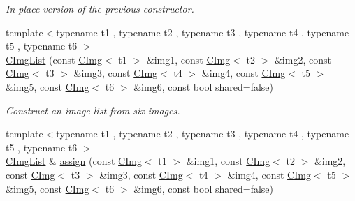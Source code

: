 \begin{DoxyCompactItemize}
\begin{DoxyCompactList}\small\item\em In-\/place version of the previous constructor. \end{DoxyCompactList}\item 
\hypertarget{structcimg__library_1_1_c_img_list_ae6799cfa63ac4f262913a46973d15012}{{\footnotesize template$<$typename t1 , typename t2 , typename t3 , typename t4 , typename t5 , typename t6 $>$ }\\\hyperlink{structcimg__library_1_1_c_img_list_ae6799cfa63ac4f262913a46973d15012}{C\-Img\-List} (const \hyperlink{structcimg__library_1_1_c_img}{C\-Img}$<$ t1 $>$ \&img1, const \hyperlink{structcimg__library_1_1_c_img}{C\-Img}$<$ t2 $>$ \&img2, const \hyperlink{structcimg__library_1_1_c_img}{C\-Img}$<$ t3 $>$ \&img3, const \hyperlink{structcimg__library_1_1_c_img}{C\-Img}$<$ t4 $>$ \&img4, const \hyperlink{structcimg__library_1_1_c_img}{C\-Img}$<$ t5 $>$ \&img5, const \hyperlink{structcimg__library_1_1_c_img}{C\-Img}$<$ t6 $>$ \&img6, const bool shared=false)}\label{structcimg__library_1_1_c_img_list_ae6799cfa63ac4f262913a46973d15012}

\begin{DoxyCompactList}\small\item\em Construct an image list from six images. \end{DoxyCompactList}\item 
\hypertarget{structcimg__library_1_1_c_img_list_ab2065358142d8ad6801b7ff5cc4146c6}{{\footnotesize template$<$typename t1 , typename t2 , typename t3 , typename t4 , typename t5 , typename t6 $>$ }\\\hyperlink{structcimg__library_1_1_c_img_list}{C\-Img\-List} \& \hyperlink{structcimg__library_1_1_c_img_list_ab2065358142d8ad6801b7ff5cc4146c6}{assign} (const \hyperlink{structcimg__library_1_1_c_img}{C\-Img}$<$ t1 $>$ \&img1, const \hyperlink{structcimg__library_1_1_c_img}{C\-Img}$<$ t2 $>$ \&img2, const \hyperlink{structcimg__library_1_1_c_img}{C\-Img}$<$ t3 $>$ \&img3, const \hyperlink{structcimg__library_1_1_c_img}{C\-Img}$<$ t4 $>$ \&img4, const \hyperlink{structcimg__library_1_1_c_img}{C\-Img}$<$ t5 $>$ \&img5, const \hyperlink{structcimg__library_1_1_c_img}{C\-Img}$<$ t6 $>$ \&img6, const bool shared=false)}\label{structcimg__library_1_1_c_img_list_ab2065358142d8ad6801b7ff5cc4146c6}


\end{DoxyCompactItemize}

